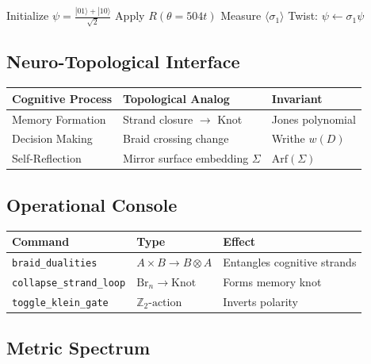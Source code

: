 \documentclass[12pt]{article}
\begin{document}
\begin{algorithm}[H]
\caption{Dyadic Cognition Loop}
\begin{algorithmic}[1]
\State Initialize $\psi = \frac{|01\rangle + |10\rangle}{\sqrt{2}}$
    \State Apply $R(\theta = 504t)$
    \State Measure $\langle \sigma_1 \rangle$
    \State Twist: $\psi \leftarrow \sigma_1 \psi$
\EndWhile
\end{algorithmic}
\end{algorithm}

\subsection{Neuro-Topological Interface}

\begin{table}[h]
\centering
\begin{tabular}{|l|l|l|}
\hline
\textbf{Cognitive Process} & \textbf{Topological Analog} & \textbf{Invariant} \\ \hline
Memory Formation & Strand closure $\to$ Knot & Jones polynomial \\ \hline
Decision Making & Braid crossing change & Writhe $w(D)$ \\ \hline
Self-Reflection & Mirror surface embedding $\Sigma$ & $\text{Arf}(\Sigma)$ \\ \hline
\end{tabular}
\end{table}

\subsection{Operational Console}

\begin{table}[h]
\centering
\begin{tabular}{|l|l|l|}
\hline
\textbf{Command} & \textbf{Type} & \textbf{Effect} \\ \hline
\texttt{braid\_dualities} & $A \times B \to B \otimes A$ & Entangles cognitive strands \\ \hline
\texttt{collapse\_strand\_loop} & $\text{Br}_n \to \text{Knot}$ & Forms memory knot \\ \hline
\texttt{toggle\_klein\_gate} & $\mathbb{Z}_2 \text{-action}$ & Inverts polarity \\ \hline
\end{tabular}
\end{table}

\subsection{Metric Spectrum}
\end{document}
